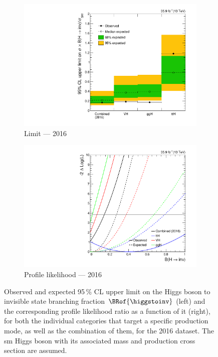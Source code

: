 \begin{figure}[htbp]
    \centering
    \begin{subfigure}[t]{0.45\textwidth}  %
        \includegraphics[width=\textwidth]{figures/limits/per_year/limit_2016_comb.pdf}
        \caption{Limit --- 2016}
    \end{subfigure}
    \hspace{0.05\textwidth}
    \begin{subfigure}[t]{0.45\textwidth}
        \includegraphics[width=\textwidth]{figures/likelihood_scan/profile_likelihood_scan_2016.pdf}
        \caption{Profile likelihood --- 2016}
    \end{subfigure}
    \caption[Observed and expected 95\,\% CL upper limit on the Higgs boson to invisible state branching fraction $\BRof{\higgstoinv}$ and the corresponding profile likelihood ratio as a function of it, for both the individual categories that target a specific production mode, as well as the combination of them, for the 2016 dataset]{Observed and expected 95\,\% CL upper limit on the Higgs boson to invisible state branching fraction $\BRof{\higgstoinv}$ (left) and the corresponding profile likelihood ratio as a function of it (right), for both the individual categories that target a specific production mode, as well as the combination of them, for the 2016 dataset. The \acrlong{sm} Higgs boson with its associated mass and production cross section are assumed.}

\end{figure}
